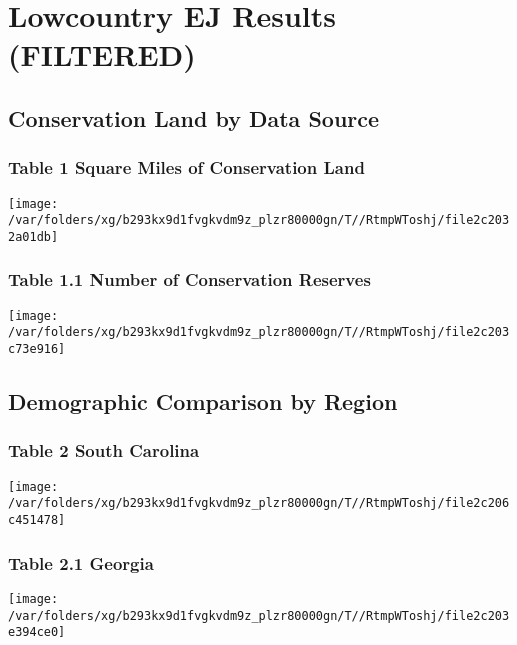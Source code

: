 \documentclass[landscape]{article}
\author{}
\date{\vspace{-2.5em}}
\begin{document}
\hypertarget{lowcountry-ej-results-filtered}{%
\section{Lowcountry EJ Results
(FILTERED)}\label{lowcountry-ej-results-filtered}}

\hypertarget{conservation-land-by-data-source}{%
\subsection{Conservation Land by Data
Source}\label{conservation-land-by-data-source}}

\hypertarget{table-1-square-miles-of-conservation-land}{%
\subsubsection{Table 1 Square Miles of Conservation
Land}\label{table-1-square-miles-of-conservation-land}}

\texttt{[image: /var/folders/xg/b293kx9d1fvgkvdm9z\_plzr80000gn/T//RtmpWToshj/file2c2032a01db]}

\hypertarget{table-1.1-number-of-conservation-reserves}{%
\subsubsection{Table 1.1 Number of Conservation
Reserves}\label{table-1.1-number-of-conservation-reserves}}

\texttt{[image: /var/folders/xg/b293kx9d1fvgkvdm9z\_plzr80000gn/T//RtmpWToshj/file2c203c73e916]}

\hypertarget{demographic-comparison-by-region}{%
\subsection{Demographic Comparison by
Region}\label{demographic-comparison-by-region}}

\hypertarget{table-2-south-carolina}{%
\subsubsection{Table 2 South Carolina}\label{table-2-south-carolina}}

\texttt{[image: /var/folders/xg/b293kx9d1fvgkvdm9z\_plzr80000gn/T//RtmpWToshj/file2c206c451478]}

\hypertarget{table-2.1-georgia}{%
\subsubsection{Table 2.1 Georgia}\label{table-2.1-georgia}}

\texttt{[image: /var/folders/xg/b293kx9d1fvgkvdm9z\_plzr80000gn/T//RtmpWToshj/file2c203e394ce0]}
\end{document}
